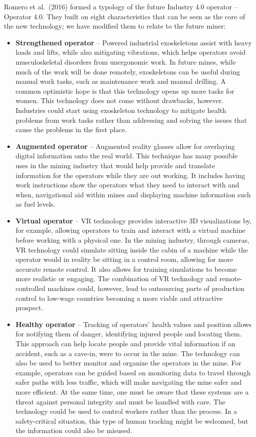 \documentclass[
  12pt,
]{scrbook}
\begin{document}
Romero et al.~(2016) formed a typology of the future Industry 4.0 operator -- Operator 4.0. They built on eight characteristics that can be seen as the core of the new technology; we have modified them to relate to the future miner:

\begin{itemize}
\item
  \textbf{Strengthened operator} -- Powered industrial exoskeletons assist with heavy loads and lifts, while also mitigating vibrations, which helps operators avoid musculoskeletal disorders from unergonomic work. In future mines, while much of the work will be done remotely, exoskeletons can be useful during manual work tasks, such as maintenance work and manual drilling. A common optimistic hope is that this technology opens up more tasks for women. This technology does not come without drawbacks, however. Industries could start using exoskeleton technology to mitigate health problems from work tasks rather than addressing and solving the issues that cause the problems in the first place.
\item
  \textbf{Augmented operator} -- Augmented reality glasses allow for overlaying digital information onto the real world. This technique has many possible uses in the mining industry that would help provide and translate information for the operators while they are out working. It includes having work instructions show the operators what they need to interact with and when, navigational aid within mines and displaying machine information such as fuel levels.
\item
  \textbf{Virtual operator} -- VR technology provides interactive 3D visualizations by, for example, allowing operators to train and interact with a virtual machine before working with a physical one. In the mining industry, through cameras, VR technology could simulate sitting inside the cabin of a machine while the operator would in reality be sitting in a control room, allowing for more accurate remote control. It also allows for training simulations to become more realistic or engaging. The combination of VR technology and remote-controlled machines could, however, lead to outsourcing parts of production control to low-wage countries becoming a more viable and attractive prospect.
\item
  \textbf{Healthy operator} -- Tracking of operators' health values and position allows for notifying them of danger, identifying injured people and locating them. This approach can help locate people and provide vital information if an accident, such as a cave-in, were to occur in the mine. The technology can also be used to better monitor and organize the operators in the mine. For example, operators can be guided based on monitoring data to travel through safer paths with less traffic, which will make navigating the mine safer and more efficient. At the same time, one must be aware that these systems are a threat against personal integrity and must be handled with care. The technology could be used to control workers rather than the process. In a safety-critical situation, this type of human tracking might be welcomed, but the information could also be misused.

\end{itemize}
\end{document}
